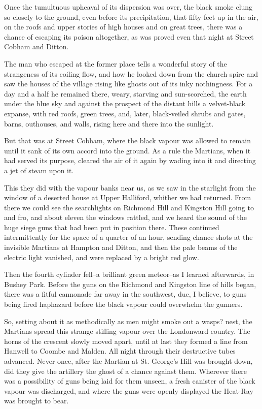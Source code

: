 Once the tumultuous upheaval of its dispersion was over, the black
smoke clung so closely to the ground, even before its
precipitation, that fifty feet up in the air, on the roofs and
upper stories of high houses and on great trees, there was a chance
of escaping its poison altogether, as was proved even that night at
Street Cobham and Ditton.

The man who escaped at the former place tells a wonderful story of
the strangeness of its coiling flow, and how he looked down from
the church spire and saw the houses of the village rising like
ghosts out of its inky nothingness. For a day and a half he
remained there, weary, starving and sun-scorched, the earth under
the blue sky and against the prospect of the distant hills a
velvet-black expanse, with red roofs, green trees, and, later,
black-veiled shrubs and gates, barns, outhouses, and walls, rising
here and there into the sunlight.

But that was at Street Cobham, where the black vapour was allowed
to remain until it sank of its own accord into the ground. As a
rule the Martians, when it had served its purpose, cleared the air
of it again by wading into it and directing a jet of steam upon
it.

This they did with the vapour banks near us, as we saw in the
starlight from the window of a deserted house at Upper Halliford,
whither we had returned. From there we could see the searchlights
on Richmond Hill and Kingston Hill going to and fro, and about
eleven the windows rattled, and we heard the sound of the huge
siege guns that had been put in position there. These continued
intermittently for the space of a quarter of an hour, sending
chance shots at the invisible Martians at Hampton and Ditton, and
then the pale beams of the electric light vanished, and were
replaced by a bright red glow.

Then the fourth cylinder fell--a brilliant green meteor--as I
learned afterwards, in Bushey Park. Before the guns on the Richmond
and Kingston line of hills began, there was a fitful cannonade far
away in the southwest, due, I believe, to guns being fired
haphazard before the black vapour could overwhelm the gunners.

So, setting about it as methodically as men might smoke out a
wasps? nest, the Martians spread this strange stifling vapour over
the Londonward country. The horns of the crescent slowly moved
apart, until at last they formed a line from Hanwell to Coombe and
Malden. All night through their destructive tubes advanced. Never
once, after the Martian at St. George's Hill was brought down, did
they give the artillery the ghost of a chance against them.
Wherever there was a possibility of guns being laid for them
unseen, a fresh canister of the black vapour was discharged, and
where the guns were openly displayed the Heat-Ray was brought to
bear.

